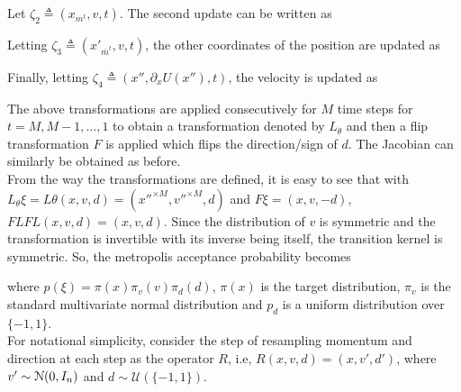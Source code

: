 \documentclass[letterpaper,english,10pt]{article}
\begin{document}

Let $\zeta_2 \triangleq (x_{m^t}, v, t)$. The second update can be written as


Letting $\zeta_3 \triangleq (x'_{\bar{m}^t}, v, t)$, the other coordinates of the position are updated as


Finally, letting $\zeta_4 \triangleq (x'', \partial_x U(x''), t)$, the velocity is updated as


The above transformations are applied consecutively for $M$ time steps for $t=M,M-1, \dots, 1$ to obtain a transformation denoted by $L_\theta$ and then a flip transformation $F$ is applied which flips the direction/sign of $d$. The Jacobian can similarly be obtained as before. \\

From the way the transformations are defined, it is easy to see that with $L_\theta \xi = L\theta(x,v,d) = (x''^{\times M}, v''^{\times M}, d)$ and $F \xi = (x, v, -d)$, $FLFL(x,v,d) = (x,v,d)$. Since the distribution of $v$ is symmetric and the transformation is invertible with its inverse being itself, the transition kernel is symmetric. So, the metropolis acceptance probability becomes


where $p(\xi) = \pi(x) \pi_v(v) \pi_d(d)$, $\pi(x)$ is the target distribution, $\pi_v$ is the standard multivariate normal distribution and $p_d$ is a uniform distribution over $\{-1, 1\}$. \\

For notational simplicity, consider the step of resampling momentum and direction at each step as the operator $R$, i.e, $R(x,v,d) = (x, v', d')$, where $v' \sim \mathcal{N}(0, I_n)$ and $d \sim \mathcal{U}(\{ -1, 1 \})$. \\
\end{document}
